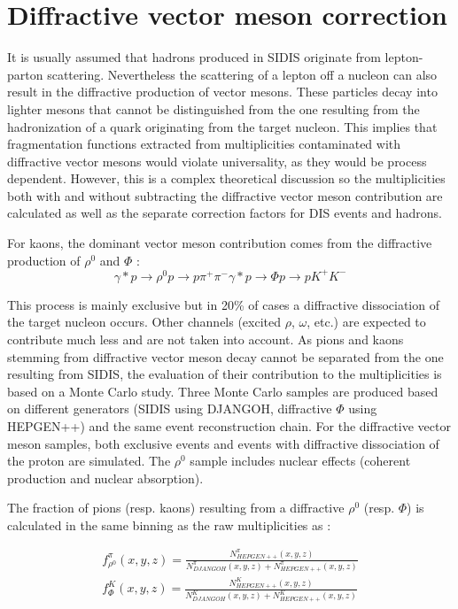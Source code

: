 \newpage

\section{Diffractive vector meson correction}

It is usually assumed that hadrons produced in SIDIS originate from lepton-parton scattering. Nevertheless the scattering of a lepton off a nucleon can also result in the diffractive production of vector mesons. These particles decay into lighter mesons that cannot be distinguished from the one resulting from the hadronization of a quark originating from the target nucleon. This implies that fragmentation functions extracted from multiplicities contaminated with diffractive vector mesons would violate universality, as they would be process dependent. However, this is a complex theoretical discussion so the multiplicities both with and without subtracting the diffractive vector meson contribution are calculated as well as the separate correction factors for DIS events and hadrons.

For kaons, the dominant vector meson contribution comes from the diffractive production of $\rho^0$ and $\Phi$ :
\begin{equation}
    \gamma * p \rightarrow \rho^0 p \rightarrow p\pi^+\pi^-
    \gamma * p \rightarrow \Phi p \rightarrow pK^+K^-
\end{equation}

This process is mainly exclusive but in 20\% of cases a diffractive dissociation of the target nucleon occurs. Other channels (excited $\rho$, $\omega$, etc.) are expected to contribute much less and are not taken into account. As pions and kaons stemming from diffractive vector meson decay cannot be separated from the one resulting from SIDIS, the evaluation of their contribution to the multiplicities is based on a Monte Carlo study. Three Monte Carlo samples are produced based on different generators (SIDIS using DJANGOH, diffractive $\Phi$ using HEPGEN++) and the same event reconstruction chain. For the diffractive vector meson samples, both exclusive events and events with diffractive dissociation of the proton are simulated. The $\rho^0$ sample includes nuclear effects (coherent production and nuclear absorption).

The fraction of pions (resp. kaons) resulting from a diffractive $\rho^0$ (resp. $\Phi$) is calculated in the same binning as the raw multiplicities as :

\begin{equation}
  \begin{split}
    f^{\pi}_{\rho^0}(x,y,z) = \frac{N^{\pi}_{HEPGEN++}(x,y,z)}{N^{\pi}_{DJANGOH}(x,y,z)+N^{\pi}_{HEPGEN++}(x,y,z)} \\
    f^K_{\Phi}(x,y,z) = \frac{N^K_{HEPGEN++}(x,y,z)}{N^K_{DJANGOH}(x,y,z)+N^K_{HEPGEN++}(x,y,z)}
  \end{split}
\end{equation}

